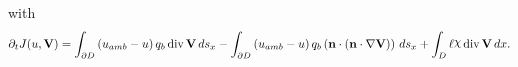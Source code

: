 \documentclass[preview]{standalone}
\let\oldcdot\cdot
\let\cdot\oldcdot
\begin{document}
with
\begin{dmath*}
\partial_{t} J(u,{\mathbf V}) =  \int_{\partial D} \left(u_{amb} - u\right) q_{b} \operatorname{div} {\mathbf V} \,ds_x -  \int_{\partial D} \left(u_{amb} - u\right) q_{b} \left( \mathbf n \cdot \left( \mathbf n \cdot  \nabla {\mathbf V}  \right) \right) \,ds_x +  \int_{D} \ell \raisebox{\depth}{$\chi$} \operatorname{div} {\mathbf V} \,dx.
 \end{dmath*}
\end{document}
